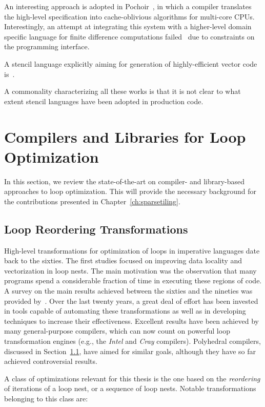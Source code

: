 An interesting approach is adopted in Pochoir~\cite{pochoir}, in which a compiler translates the high-level specification into cache-oblivious algorithms for multi-core CPUs. Interestingly, an attempt at integrating this system with a higher-level domain specific language for finite difference computations failed~\cite{tj-thesis} due to constraints on the programming interface. 

A stencil language explicitly aiming for generation of highly-efficient vector code is~\cite{stencil-compiler-2-simd}.

A commonality characterizing all these works is that it is not clear to what extent stencil languages have been adopted in production code. 


\section{Compilers and Libraries for Loop Optimization}
\label{sec:bkg:codeopt}
In this section, we review the state-of-the-art on compiler- and library-based approaches to loop optimization. This will provide the necessary background for the contributions presented in Chapter~\ref{ch:sparsetiling}.

\subsection{Loop Reordering Transformations}
\label{sec:bkg:poly}
High-level transformations for optimization of loops in imperative languages date back to the sixties. The first studies focused on improving data locality and vectorization in loop nests. The main motivation was the observation that many programs spend a considerable fraction of time in executing these regions of code. A survey on the main results achieved between the sixties and the nineties was provided by~\cite{bacon-comp-transf}. Over the last twenty years, a great deal of effort has been invested in tools capable of automating these transformations as well as in developing techniques to increase their effectiveness. Excellent results have been achieved by many general-purpose compilers, which can now count on powerful loop transformation engines (e.g., the {\em Intel} and {\em Cray} compilers). Polyhedral compilers, discussed in Section~\ref{sec:bkg:poly}, have aimed for similar goals, although they have so far achieved controversial results.

A class of optimizations relevant for this thesis is the one based on the {\em reordering} of iterations of a loop nest, or a sequence of loop nests. Notable transformations belonging to this class are:


